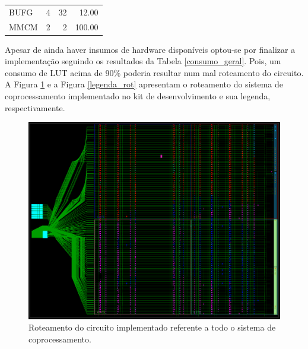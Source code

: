 \begin{table}[!h]
\begin{tabular}{lrrr}
		BUFG                                                          & 4                                                               & 32                                                              & 12.00                                                                \\
		\rowcolor[HTML]{DAE8FC} 
		MMCM                                                          & 2                                                               & 2                                                               & 100.00                                                              
	\end{tabular}
\end{table}

Apesar de ainda haver insumos de hardware disponíveis optou-se por finalizar a implementação seguindo os resultados da Tabela \ref{consumo_geral}. Pois, um consumo de LUT acima de 90\% poderia resultar num mal roteamento do circuito.\\

A Figura \ref{roteamento} e a Figura \ref{legenda_rot} apresentam o roteamento do sistema de coprocessamento implementado no kit de desenvolvimento e sua legenda, respectivamente.
\begin{figure}[!h]
	\centering
	\includegraphics[keepaspectratio=true,scale=0.40]{figuras/roteamento.png}
	\caption{Roteamento do circuito implementado referente a todo o sistema de coprocessamento.}
	\label{roteamento}
\end{figure}


